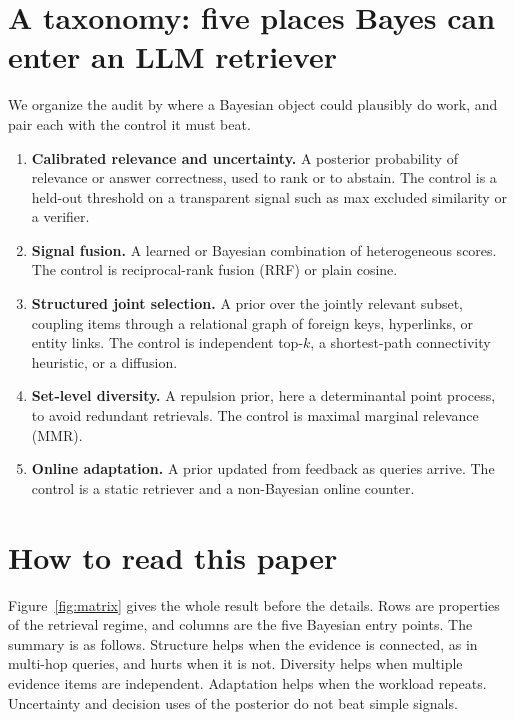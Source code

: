 \documentclass[11pt]{article}
\begin{document}
\section{A taxonomy: five places Bayes can enter an LLM retriever}\label{sec:taxonomy}

We organize the audit by where a Bayesian object could plausibly do work, and pair each with the
control it must beat.

\begin{enumerate}[leftmargin=1.6em,itemsep=3pt]
\item \textbf{Calibrated relevance and uncertainty.} A posterior probability of relevance or answer
correctness, used to rank or to abstain. The control is a held-out threshold on a transparent signal
such as max excluded similarity or a verifier.
\item \textbf{Signal fusion.} A learned or Bayesian combination of heterogeneous scores. The control is
reciprocal-rank fusion (RRF) or plain cosine.
\item \textbf{Structured joint selection.} A prior over the jointly relevant subset, coupling items
through a relational graph of foreign keys, hyperlinks, or entity links. The control is independent
top-$k$, a shortest-path connectivity heuristic, or a diffusion.
\item \textbf{Set-level diversity.} A repulsion prior, here a determinantal point process, to avoid
redundant retrievals. The control is maximal marginal relevance (MMR).
\item \textbf{Online adaptation.} A prior updated from feedback as queries arrive. The control is a
static retriever and a non-Bayesian online counter.
\end{enumerate}

\section{How to read this paper}\label{sec:guide}

Figure~\ref{fig:matrix} gives the whole result before the details. Rows are properties of the retrieval
regime, and columns are the five Bayesian entry points. The summary is as follows. Structure helps when
the evidence is connected, as in multi-hop queries, and hurts when it is not. Diversity helps when
multiple evidence items are independent. Adaptation helps when the workload repeats. Uncertainty and
decision uses of the posterior do not beat simple signals.
\end{document}
